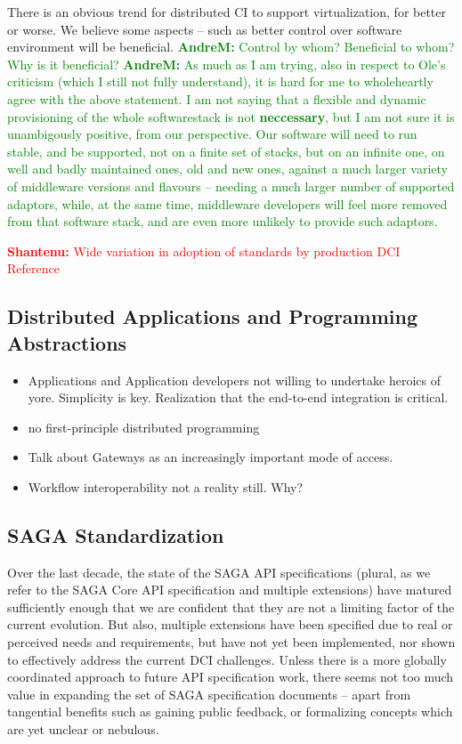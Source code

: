 \documentclass{article}
\newcommand{\B}[1]{\textbf{#1}}
\newcommand{\jhanote}[1]{{\textcolor{red}{     \B{Shantenu:} #1 }}}
\newcommand{\amnote}[1]{{\textcolor{green}{   \B{AndreM:  } #1 }}}
\newcommand{\jhanote}[1]{}
\newcommand{\amnote}[1]{}
\begin{document}
  There is an obvious trend for distributed CI to support
  virtualization, for better or worse. We believe some aspects -- such
  as better control over software environment will be beneficial. 
  \amnote{Control by whom? Beneficial to whom? Why is it beneficial?}
  \amnote{As much as I am trying, also in respect to Ole's criticism
  (which I still not fully understand), it is hard for me to
  wholeheartly agree with the above statement.  I am not saying that a
  flexible and dynamic provisioning of the whole softwarestack is not
  \B{neccessary}, but I am not sure it is unambigously positive, from
  our perspective.  Our software will need to run stable, and be
  supported, not on a finite set of stacks, but on an infinite one, on
  well and badly maintained ones, old and new ones, against a much
  larger variety of middleware versions and flavours -- needing a much
  larger number of supported adaptors, while, at the same time,
  middleware developers will feel more removed from that software
  stack, and are even more unlikely to provide such adaptors.}
   
  \jhanote{Wide variation in adoption of standards by production DCI
  Reference~\cite{dpa-pdci-tr}}

   
\subsection{Distributed Applications and Programming Abstractions}

 \begin{itemize}
 \item Applications and Application developers not willing to
   undertake heroics of yore. Simplicity is key. Realization that the
   end-to-end integration is critical.
 \item no first-principle distributed programming
 \item Talk about Gateways as an increasingly important mode of
   access. 
 \item Workflow interoperability not a reality still. Why?
 \end{itemize}

 \subsection{SAGA Standardization}

  Over the last decade, the state of the SAGA API specifications
  (plural, as we refer to the SAGA Core API specification and multiple
  extensions) have matured sufficiently enough that we are confident
  that they are not a limiting factor of the current evolution.  But
  also, multiple extensions have been specified due to real or perceived
  needs and requirements, but have not yet been implemented, nor shown
  to effectively address the current DCI challenges.  Unless there is
  a more globally coordinated approach to future API specification work,
  there seems not too much value in expanding the set of SAGA
  specification documents -- apart from tangential benefits such as
  gaining public feedback, or formalizing concepts which are yet unclear
  or nebulous.
\end{document}
